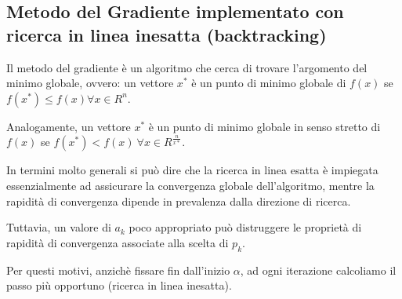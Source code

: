 {\color{oorange}\subsection{Metodo del Gradiente implementato con ricerca in linea inesatta (backtracking)}}
Il metodo del gradiente è un algoritmo che cerca di trovare l'argomento del minimo globale, ovvero:
un vettore $x^{\ast}$ è un punto di minimo globale di $f(x)$ se $f(x^{\ast}) \leq f(x) \forall x \in R^n$.

Analogamente, un vettore $x^{\ast}$ è un punto di minimo globale in senso stretto di $f(x)$ 
se $f(x^{\ast}) < f(x) \: \forall x \in R^{\frac{n}{x\ast}}$.

In termini molto generali si può dire che la ricerca in linea esatta è impiegata essenzialmente ad assicurare 
la convergenza globale dell'algoritmo, mentre la rapidità di convergenza dipende in prevalenza dalla direzione 
di ricerca. 

Tuttavia, un valore di $a_k$ poco appropriato può distruggere le proprietà di rapidità di convergenza associate 
alla scelta di $p_k$.

Per questi motivi, anzichè fissare fin dall'inizio $\alpha$, ad ogni iterazione calcoliamo il passo più opportuno 
(ricerca in linea inesatta).

